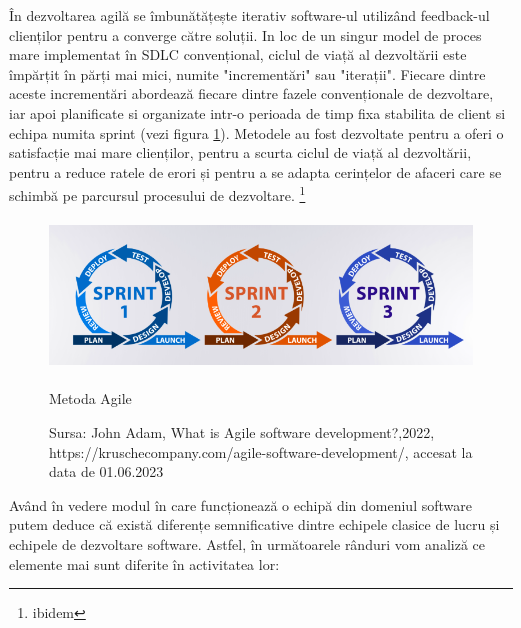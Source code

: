 \documentclass[a4paper, 12pt]{article}
\begin{document}
	\quad În dezvoltarea agilă se îmbunătățește iterativ software-ul utilizând feedback-ul clienților pentru a converge către soluții. In loc de un singur model de proces mare implementat în SDLC convențional, ciclul de viață al dezvoltării este împărțit în părți mai mici, numite "incrementări" sau "iterații". Fiecare dintre aceste incrementări abordează fiecare dintre fazele convenționale de dezvoltare, iar apoi planificate si organizate intr-o perioada de timp fixa stabilita de client si echipa numita sprint (vezi figura \ref{fig:two}). Metodele au fost dezvoltate pentru a oferi o satisfacție mai mare clienților, pentru a scurta ciclul de viață al dezvoltării, pentru a reduce ratele de erori și pentru a se adapta cerințelor de afaceri care se schimbă pe parcursul procesului de dezvoltare. \footnote{ibidem}

\begin{figure}[!htb]
			\centering
			\includegraphics[width=14cm, height=4cm]{"figures/sprint.png"}
			\caption {Metoda Agile}\label{fig:two}
			\caption*{Sursa: John Adam, What is Agile software development?,2022, https://kruschecompany.com/agile-software-development/, accesat la data de 01.06.2023}
		\end{figure}

	\quad\quad Având în vedere modul în care funcționează o echipă din domeniul software putem deduce că există diferențe semnificative dintre echipele clasice de lucru și echipele de dezvoltare software. Astfel, în următoarele rânduri vom analiză ce elemente mai sunt diferite în activitatea lor:
\end{document}
